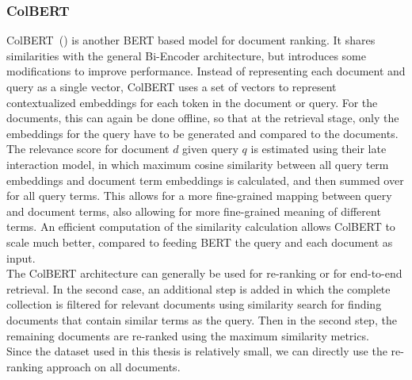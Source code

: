 \subsubsection{ColBERT}\label{sec:colbert}
ColBERT~(\cite{khattab:2020}) is another BERT based model for document ranking.
It shares similarities with the general Bi-Encoder architecture, but introduces some modifications to improve performance.
Instead of representing each document and query as a single vector, ColBERT uses a set of vectors to represent contextualized embeddings for each token in the document or query.
For the documents, this can again be done offline, so that at the retrieval stage, only the embeddings for the query have to be generated and compared to the documents.
The relevance score for document $d$ given query $q$ is estimated using their late interaction model, in which maximum cosine similarity between all query term embeddings and document term embeddings is calculated, and then summed over for all query terms.
This allows for a more fine-grained mapping between query and document terms, also allowing for more fine-grained meaning of different terms.
An efficient computation of the similarity calculation allows ColBERT to scale much better, compared to feeding BERT the query and each document as input.
\\
The ColBERT architecture can generally be used for re-ranking or for end-to-end retrieval.
In the second case, an additional step is added in which the complete collection is filtered for relevant documents using similarity search for finding documents that contain similar terms as the query.
Then in the second step, the remaining documents are re-ranked using the maximum similarity metrics.
\\
Since the dataset used in this thesis is relatively small, we can directly use the re-ranking approach on all documents.


